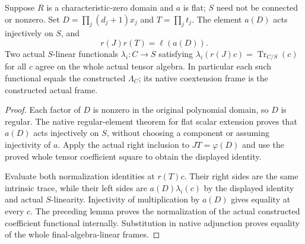 \begin{theorem}
\label{thm:kn-nadel-flat-tensor-trace-uniqueness}
\leanok
Suppose $R$ is a characteristic-zero domain and $a$ is flat; $S$ need
not be connected or nonzero.  Set $D=\prod_j(d_j+1)x_j$ and
$T=\prod_jt_j$.  The element $a(D)$ acts injectively on $S$, and
\[
 r(J)r(T)=\ell(a(D)).
\]
Two actual $S$-linear functionals $\lambda_i:C\to S$ satisfying
$\lambda_i(r(J)c)=\operatorname{Tr}_{C/S}(c)$ for all $c$ agree on
the whole actual tensor algebra.  In particular each such functional
equals the constructed $\Lambda_C$; its native coextension frame is
the constructed actual frame.
\end{theorem}
\begin{proof}
Each factor of $D$ is nonzero in the original polynomial domain, so
$D$ is regular.  The native regular-element theorem for flat scalar
extension proves that $a(D)$ acts injectively on $S$, without choosing
a component or assuming injectivity of $a$.  Apply the actual right
inclusion to $JT=\varphi(D)$ and use the proved whole tensor coefficient
square to obtain the displayed identity.

Evaluate both normalization identities at $r(T)c$.  Their right sides
are the same intrinsic trace, while their left sides are
$a(D)\lambda_i(c)$ by the displayed identity and actual $S$-linearity.
Injectivity of multiplication by $a(D)$ gives equality at every $c$.
The preceding lemma proves the normalization of the actual constructed
coefficient functional internally.  Substitution in native adjunction
proves equality of the whole final-algebra-linear frames.
\end{proof}

